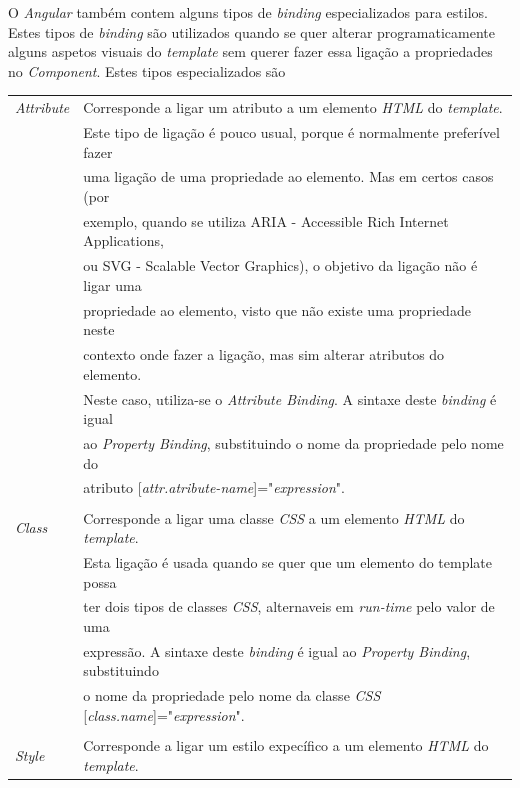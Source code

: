 O \textit{Angular} também contem alguns tipos de \textit{binding} especializados para estilos. Estes tipos de \textit{binding} são utilizados quando se quer alterar programaticamente alguns aspetos visuais do \textit{template} sem querer fazer essa ligação a propriedades no \textit{Component}. Estes tipos especializados são\\

\begin{tabular}{ll}
	\textit{Attribute} & Corresponde a ligar um atributo a um elemento \textit{HTML} do \textit{template}. \\
	&Este tipo de ligação é pouco usual, porque é normalmente preferível fazer \\
	&uma ligação de uma propriedade ao elemento. Mas em certos casos (por \\
	&exemplo, quando se utiliza ARIA - Accessible Rich Internet Applications, \\
	&ou SVG - Scalable Vector Graphics), o objetivo da ligação não é ligar uma \\
	&propriedade ao elemento, visto que não existe uma propriedade neste \\
	&contexto onde fazer a ligação, mas sim alterar atributos do elemento. \\
	&Neste caso, utiliza-se o \textit{Attribute Binding}. A sintaxe deste \textit{binding} é igual \\
	&ao \textit{Property Binding}, substituindo o nome da propriedade pelo nome do \\
	&atributo [\textit{attr.atribute-name}]="\textit{expression}".\\
	\\
	\textit{Class} & Corresponde a ligar uma classe \textit{CSS} a um elemento \textit{HTML} do \textit{template}. \\
	&Esta ligação é usada quando se quer que um elemento do template possa \\
	&ter dois tipos de classes \textit{CSS}, alternaveis em \textit{run-time} pelo valor de uma \\
	&expressão. A sintaxe deste \textit{binding} é igual ao \textit{Property Binding}, substituindo \\
	&o nome da propriedade pelo nome da classe \textit{CSS} [\textit{class.name}]="\textit{expression}".\\
	\\
	\textit{Style} & Corresponde a ligar um estilo expecífico a um elemento \textit{HTML} do \textit{template}. \\

\end{tabular}
